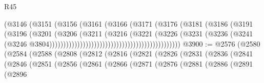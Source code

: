 \begin{lexlean}{R45}
\begin{coremodule}
                                                        (@3146
                                                          (@3151
                                                            (@3156
                                                              (@3161
                                                                (@3166
                                                                  (@3171
                                                                    (@3176
                                                                      (@3181
                                                                        (@3186
                                                                          (@3191
                                                                            (@3196
                                                                              (@3201
                                                                                (@3206
                                                                                  (@3211
                                                                                    (@3216
                                                                                      (@3221
                                                                                        (@3226
                                                                                          (@3231
                                                                                            (@3236
                                                                                              (@3241
                                                                                                (@3246
                                                                                                  @3804)))))))))))))))))))))))))))))))))))))))))))))))
@3900 := @2576
    (@2580
      (@2584
        (@2588
          (@2808
            (@2812
              (@2816
                (@2821
                  (@2826
                    (@2831
                      (@2836
                        (@2841
                          (@2846
                            (@2851
                              (@2856
                                (@2861
                                  (@2866
                                    (@2871
                                      (@2876
                                        (@2881
                                          (@2886
                                            (@2891
                                              (@2896

\end{coremodule}
\end{lexlean}
